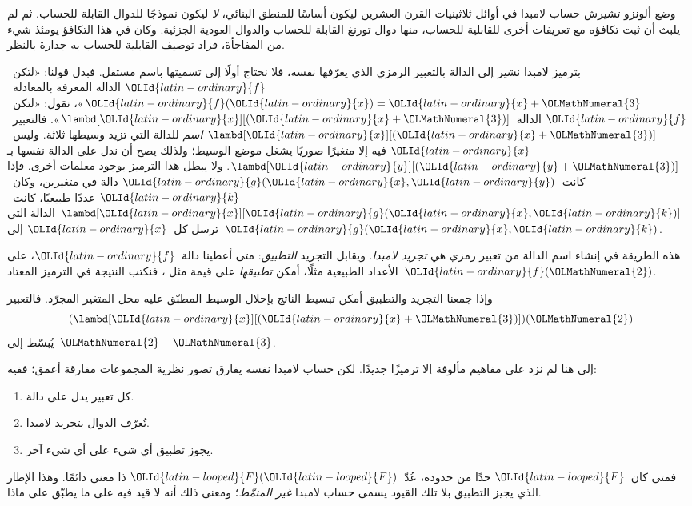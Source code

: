\documentclass[../../../include/open-logic-section]{subfiles}
\begin{document}

وضع ألونزو تشيرش حساب لامبدا في أوائل ثلاثينيات القرن العشرين
ليكون أساسًا للمنطق البنائي، \emph{لا} ليكون نموذجًا للدوال القابلة
للحساب. ثم لم يلبث أن ثبت تكافؤه مع تعريفات أخرى للقابلية للحساب،
منها دوال تورنغ القابلة للحساب والدوال العودية الجزئية.
وكان في هذا التكافؤ يومئذ شيء من المفاجأة، فزاد توصيف القابلية
للحساب به جدارة بالنظر.

بترميز لامبدا نشير إلى الدالة بالتعبير الرمزي الذي يعرّفها نفسه،
فلا نحتاج أولًا إلى تسميتها باسم مستقل. فبدل قولنا:
«لتكن~$\OLId{latin-ordinary}{f}$ الدالة المعرفة بالمعادلة~$\OLId{latin-ordinary}{f}(\OLId{latin-ordinary}{x}) = \OLId{latin-ordinary}{x} + \OLMathNumeral{3}$»، نقول:
«لتكن~$\OLId{latin-ordinary}{f}$ الدالة~$\lambd[\OLId{latin-ordinary}{x}][(\OLId{latin-ordinary}{x} + \OLMathNumeral{3})]$».
فالتعبير~$\lambd[\OLId{latin-ordinary}{x}][(\OLId{latin-ordinary}{x}+\OLMathNumeral{3})]$ \emph{اسم} للدالة التي تزيد وسيطها
ثلاثة. وليس~$\OLId{latin-ordinary}{x}$ فيه إلا متغيرًا صوريًا يشغل موضع الوسيط؛
ولذلك يصح أن ندل على الدالة نفسها بـ$\lambd[\OLId{latin-ordinary}{y}][(\OLId{latin-ordinary}{y} + \OLMathNumeral{3})]$.
ولا يبطل هذا الترميز بوجود معلمات أخرى.
فإذا كانت~$\OLId{latin-ordinary}{g}(\OLId{latin-ordinary}{x}, \OLId{latin-ordinary}{y})$ دالة في متغيرين، وكان~$\OLId{latin-ordinary}{k}$ عددًا طبيعيًا،
كانت~$\lambd[\OLId{latin-ordinary}{x}][\OLId{latin-ordinary}{g}(\OLId{latin-ordinary}{x},\OLId{latin-ordinary}{k})]$ الدالة التي ترسل كل~$\OLId{latin-ordinary}{x}$ إلى~$\OLId{latin-ordinary}{g}(\OLId{latin-ordinary}{x}, \OLId{latin-ordinary}{k})$.

هذه الطريقة في إنشاء اسم الدالة من تعبير رمزي هي
\emph{تجريد لامبدا}. ويقابل التجريد \emph{التطبيق}:
متى أعطينا دالة~$\OLId{latin-ordinary}{f}$، على الأعداد الطبيعية مثلًا، أمكن
\emph{تطبيقها} على قيمة مثل ، فنكتب النتيجة في الترميز
المعتاد~$\OLId{latin-ordinary}{f}(\OLMathNumeral{2})$.

وإذا جمعنا التجريد والتطبيق أمكن تبسيط الناتج بإحلال الوسيط
المطبّق عليه محل المتغير المجرّد. فالتعبير
\[
(\lambd[\OLId{latin-ordinary}{x}][(\OLId{latin-ordinary}{x} + \OLMathNumeral{3})])(\OLMathNumeral{2})
\]
يُبسّط إلى~$\OLMathNumeral{2} + \OLMathNumeral{3}$.

إلى هنا لم نزد على مفاهيم مألوفة إلا ترميزًا جديدًا.
لكن حساب لامبدا نفسه يفارق تصور نظرية المجموعات مفارقة أعمق؛
ففيه:
\begin{enumerate}
\item كل تعبير يدل على دالة.
\item تُعرّف الدوال بتجريد لامبدا.
\item يجوز تطبيق أي شيء على أي شيء آخر.
\end{enumerate}
فمتى كان~$\OLId{latin-looped}{F}$ حدًا من حدوده، عُدّ~$\OLId{latin-looped}{F}(\OLId{latin-looped}{F})$ ذا معنى دائمًا.
وهذا الإطار الذي يجيز التطبيق بلا تلك القيود يسمى حساب
لامبدا \emph{غير المنمّط}؛ ومعنى ذلك أنه لا قيد فيه على ما
يطبّق على ماذا.
\end{document}
